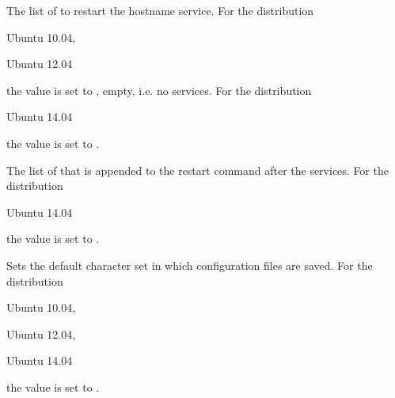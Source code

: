 
The list of  to restart the hostname service.
For the distribution
\begin{inparaitem}
\item[\TheDistribution{ubuntu}] Ubuntu 10.04,
\item[\TheDistribution{ubuntu}] Ubuntu 12.04
\end{inparaitem}
the value is set to \qcode{}, empty, i.e. no services.
For the distribution
\begin{inparaitem}
\item[\TheDistribution{ubuntu}] Ubuntu 14.04
\end{inparaitem}
the value is set to .


The list of  that is appended to the restart command after the services.
For the distribution
\begin{inparaitem}
\item[\TheDistribution{ubuntu}] Ubuntu 14.04
\end{inparaitem}
the value is set to .


Sets the default character set  in which configuration files are 
saved. For the distribution
\begin{inparaitem}
\item[\TheDistribution{ubuntu}] Ubuntu 10.04,
\item[\TheDistribution{ubuntu}] Ubuntu 12.04,
\item[\TheDistribution{ubuntu}] Ubuntu 14.04
\end{inparaitem}
the value is set to .

